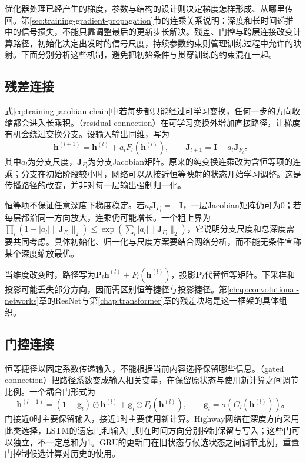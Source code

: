 优化器处理已经产生的梯度，参数与结构的设计则决定梯度怎样形成、从哪里传回。第\ref{sec:training-gradient-propagation}节的连乘关系说明：深度和长时间递推中的信号损失，不能只靠调整最后的更新步长解决。残差、门控与跨层连接改变计算路径，初始化决定出发时的信号尺度，持续参数约束则管理训练过程中允许的映射。下面分别分析这些机制，避免把初始条件与贯穿训练的约束混在一起。

\subsection{残差连接}
\label{sec:training-residual}

式\eqref{eq:training-jacobian-chain}中若每步都只能经过可学习变换，任何一步的方向收缩都会进入长乘积。（residual connection）在可学习变换外增加直接路径，让梯度有机会绕过变换分支。设输入输出同维，写为
\begin{equation}
  \bm h^{(l+1)}=\bm h^{(l)}+a_lF_l(\bm h^{(l)}),\qquad
  \bm J_{l+1}=\bm I+a_l\bm J_{F_l}\text{。}
  \label{eq:training-residual-jacobian}
\end{equation}
其中$a_l$为分支尺度，$\bm J_{F_l}$为分支Jacobian矩阵。原来的纯变换连乘改为含恒等项的连乘；分支在初始阶段较小时，网络可以从接近恒等映射的状态开始学习调整。这是传播路径的改变，并非对每一层输出强制归一化。

恒等项不保证任意深度下梯度稳定。若$a_l\bm J_{F_l}=-\bm I$，一层Jacobian矩阵仍可为0；若每层都沿同一方向放大，连乘仍可能增长。一个粗上界为$\prod_l(1+|a_l|\lVert\bm J_{F_l}\rVert_2)\leq\exp(\sum_l|a_l|\lVert\bm J_{F_l}\rVert_2)$，它说明分支尺度和总深度需要共同考虑。具体初始化、归一化与尺度方案要结合网络分析，而不能无条件宣称某个深度缩放最优。

当维度改变时，路径写为$\bm P_l\bm h^{(l)}+F_l(\bm h^{(l)})$，投影$\bm P_l$代替恒等矩阵。下采样和投影可能丢失部分方向，因而需区别恒等捷径与投影捷径。第\ref{chap:convolutional-networks}章的ResNet与第\ref{chap:transformer}章的残差块均是这一框架的具体组织。

\subsection{门控连接}
\label{sec:training-gates}

恒等捷径以固定系数传递输入，不能根据当前内容选择保留哪些信息。（gated connection）把路径系数变成输入相关变量，在保留原状态与使用新计算之间调节比例。一个耦合门形式为
\begin{equation}
  \bm h^{(l+1)}=(\bm1-\bm g_l)\odot\bm h^{(l)}
                   +\bm g_l\odot F_l(\bm h^{(l)}),
  \qquad\bm g_l=\sigma(G_l(\bm h^{(l)}))\text{。}
  \label{eq:training-gated-connection}
\end{equation}
门接近0时主要保留输入，接近1时主要使用新计算。Highway网络在深度方向采用此类选择，LSTM的遗忘门和输入门则在时间方向分别控制保留与写入；这些门可以独立，不一定总和为1。GRU的更新门在旧状态与候选状态之间调节比例，重置门控制候选计算对历史的使用。

